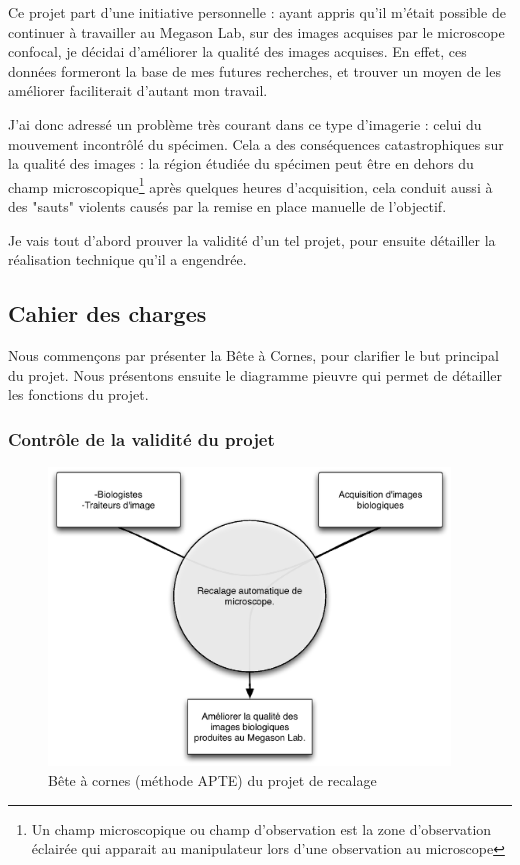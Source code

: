 Ce projet part d'une initiative personnelle : ayant appris qu'il m'était possible de continuer à travailler au Megason Lab, sur des images acquises par le microscope confocal, je décidai d'améliorer la qualité des images acquises. En effet, ces données formeront la base de mes futures recherches, et trouver un moyen de les améliorer faciliterait d'autant mon travail.

J'ai donc adressé un problème très courant dans ce type d'imagerie : 
celui du mouvement incontrôlé du spécimen.
Cela a des conséquences catastrophiques sur la qualité des images : 
la région étudiée du spécimen peut être en dehors 
du champ microscopique\footnote{Un champ microscopique ou champ d'observation est la zone d'observation éclairée qui apparait au manipulateur lors d'une observation au microscope}
après quelques heures d'acquisition,
cela conduit aussi à des "sauts" violents causés par la remise en place manuelle de l'objectif.

Je vais tout d'abord prouver la validité d'un tel projet, pour ensuite détailler la réalisation technique qu'il a engendrée.
\subsection{Cahier des charges}
Nous commençons par présenter la Bête à Cornes,
pour clarifier le but principal du projet. Nous présentons ensuite le diagramme pieuvre qui permet de détailler les fonctions du projet.

\subsubsection{Contrôle de la validité du projet}
\begin{figure}[h]
\begin{center}
\leavevmode
\includegraphics[width=0.95\textwidth]{pictures/RecalBAC}
\end{center}
\caption{Bête à cornes (méthode {APTE\textregistered}) du projet de recalage}
\label{fig:BACRecal}
\end{figure}

